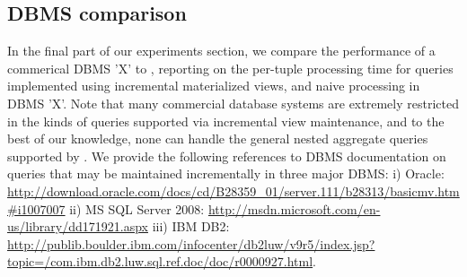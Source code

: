 


\subsection{DBMS comparison}
In the final part of our experiments section, we compare the performance of a
commerical DBMS 'X' to \compiler, reporting on the per-tuple processing time for
queries implemented using incremental materialized views, and naive processing
in DBMS 'X'. Note that many commercial database systems are extremely restricted
in the kinds of queries supported via incremental view maintenance, and to the
best of our knowledge, none can handle the general nested aggregate queries
supported by \compiler. We provide the following references to DBMS
documentation on queries that may be maintained incrementally in three major
DBMS:
i) Oracle: {\tiny
    \url{http://download.oracle.com/docs/cd/B28359_01/server.111/b28313/basicmv.htm#i1007007}}
ii) MS SQL Server 2008: {\tiny
    \url{http://msdn.microsoft.com/en-us/library/dd171921.aspx}}
iii) IBM DB2: {\tiny
    \url{http://publib.boulder.ibm.com/infocenter/db2luw/v9r5/index.jsp?topic=/com.ibm.db2.luw.sql.ref.doc/doc/r0000927.html}}.


